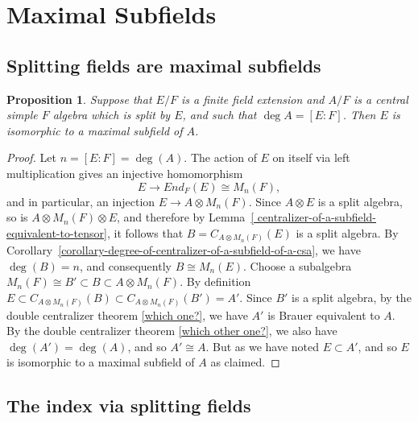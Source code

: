 \documentclass[12pt]{report}
\theoremstyle{plain}
\newtheorem{prop}[thm]{Proposition}
\begin{document}
\section{Maximal Subfields}

\subsection{Splitting fields are maximal subfields}

\begin{prop} \label{proposition-splitting-fields-are-maximal-subfields}
Suppose that $E/F$ is a finite field extension and $A/F$ is a central
simple $F$ algebra which is split by $E$, and such that $\deg A = [E:F]$.
Then $E$ is isomorphic to a maximal subfield of $A$.
\end{prop}
\begin{proof}
Let $n = [E:F] = \deg(A)$. The action of $E$ on itself via left
multiplication gives an injective homomorphism
\[E \to End_F(E) \cong M_n(F),\]
and in particular, an injection $E \to A \otimes M_n(F)$.
Since $A \otimes E$ is a split algebra, so is $A \otimes M_n(F) \otimes E$,
and therefore by Lemma~\ref{
centralizer-of-a-subfield-equivalent-to-tensor}, it follows
that $B = C_{A \otimes M_n(F)}(E)$ is a split algebra. By
Corollary~\ref{corollary-degree-of-centralizer-of-a-subfield-of-a-csa}, we
have $\deg(B) = n$, and consequently $B \cong M_n(E)$. Choose a subalgebra
$M_n(F) \cong B' \subset B \subset A \otimes M_n(F)$. By definition $E
\subset C_{A \otimes M_n(F)}(B) \subset C_{A \otimes M_n(F)}(B') = A'$.
Since $B'$ is a split algebra, by the
double centralizer theorem \ref{which one?}, we have $A'$ is Brauer
equivalent to $A$. By the double centralizer theorem \ref{which other
one?}, we also have $\deg(A') = \deg(A)$, and so $A' \cong A$. But as we
have noted $E \subset A'$, and so $E$ is isomorphic to a maximal subfield
of $A$ as claimed.
\end{proof}

\subsection{The index via splitting fields}
\end{document}
